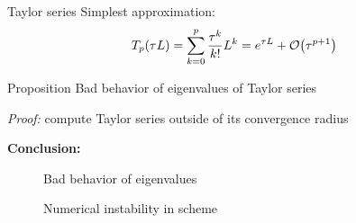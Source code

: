 \documentclass{beamer}
\newcommand{\xmark}{{\color{mred}\ding{55}}}
\newcommand{\mbold}[1]{{\textbf{\color{PLB}#1}}}
\begin{document}
\begin{frame}{Taylor series}
  Simplest approximation:
  $$
    T_p(\tau L) = \sum_{k=0}^p \frac{\tau^k}{k!}L^k = e^{\tau L} + \order{\tau^{p+1}}
  $$

  \begin{block}{Proposition}
    Bad behavior of eigenvalues of Taylor series
  \end{block}
  \emph{Proof:} compute Taylor series outside of its convergence radius

  \mbold{Conclusion:}
  \begin{description}
    \item[\xmark] Bad behavior of eigenvalues
    \item[\xmark] Numerical instability in scheme
  \end{description}
\end{frame}
\end{document}
